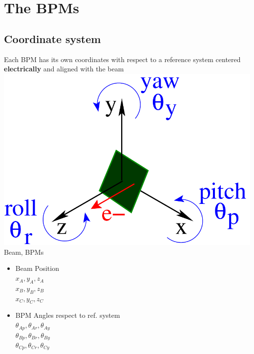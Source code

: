 \documentclass[a4paper,11pt]{book}
\begin{document}
\section{The BPMs}
\subsection{Coordinate system}\par
\centering
Each BPM has its own coordinates with respect to a reference system centered \textbf{electrically} and aligned with the beam
  \includegraphics[scale=0.3,angle=0]{fig23.pdf}\\
  {\color{red}Beam}, {\color{forestgreen} BPMs}\\
\vspace{-3.3cm}
\begin{itemize}
 \item Beam Position
 \\$x_A,y_A,z_A$\\$x_B,y_B,z_B$\\$x_C,y_C,z_C$
 \item BPM Angles respect to ref. system\\
 $\theta_{Ap},\theta_{Ar},\theta_{Ay}$\\
 $\theta_{Bp},\theta_{Br},\theta_{By}$\\
 $\theta_{Cp},\theta_{Cr},\theta_{Cy}$
\end{itemize}
\end{document}
